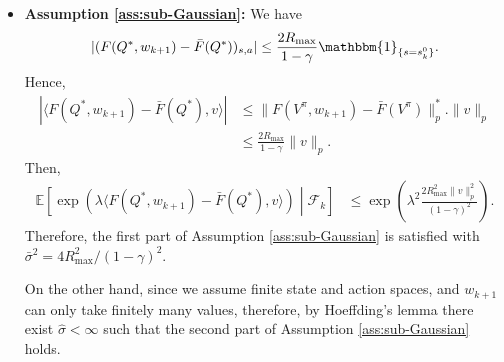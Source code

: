 \documentclass[letterpaper, 10 pt]{article}
\begin{document}
\begin{itemize}
    \item \textbf{Assumption \ref{ass:sub-Gaussian}:} We have
    \[
    |(F(Q^*,w_{k+1})-\bar{F}(Q^*))_{s,a}| \leq \frac{2R_{\max}}{1-\gamma}\mathbbm{1}_{\{s=s_k^0\}}.
    \]
    Hence,
    \begin{align*}
        |\langle F(Q^*,w_{k+1}) - \bar{F}(Q^*), v \rangle|&\leq \|F(V^\pi,w_{k+1}) - \bar{F}(V^\pi)\|_{p}^*.\|v\|_{p}\tag{H\"older's inequality}\\
        &\leq \frac{2R_{\max}}{1-\gamma}\|v\|_{p}.
    \end{align*}
    Then,
    \begin{align*}
        \mathbb{E} \left[\exp\left(\lambda \langle F(Q^*,w_{k+1}) - \bar{F}(Q^*), v \rangle \right) \middle| \mathcal{F}_k \right]  &\leq \exp\left(\lambda^2\frac{2R_{\max}^2\|v\|_{p}^2}{(1-\gamma)^2} \right).\tag{Hoffding's lemma}
    \end{align*}
    Therefore, the first part of Assumption \ref{ass:sub-Gaussian} is satisfied with $\bar{\sigma}^2=4R_{\max}^2/(1-\gamma)^2$.

    On the other hand, since we assume finite state and action spaces, and $w_{k+1}$ can only take finitely many values, therefore, by Hoeffding's lemma there exist $\hat{\sigma}<\infty$ such that the second part of Assumption \ref{ass:sub-Gaussian} holds.
\end{itemize}
\end{document}
